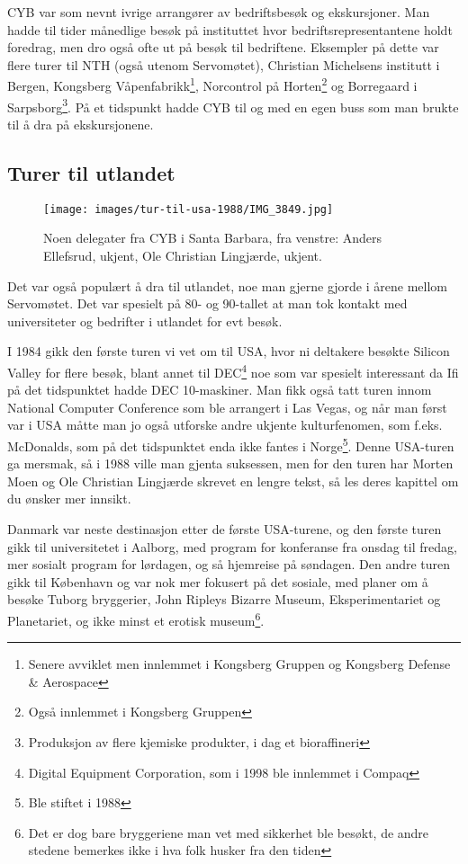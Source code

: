CYB var som nevnt ivrige arrangører av bedriftsbesøk og ekskursjoner. Man hadde til tider månedlige besøk på instituttet hvor bedriftsrepresentantene holdt foredrag, men dro også ofte ut på besøk til bedriftene. Eksempler på dette var flere turer til NTH (også utenom Servomøtet), Christian Michelsens institutt i Bergen, Kongsberg Våpenfabrikk\footnote{Senere avviklet men innlemmet i Kongsberg Gruppen og Kongsberg Defense \& Aerospace}, Norcontrol på Horten\footnote{Også innlemmet i Kongsberg Gruppen} og Borregaard i Sarpsborg\footnote{Produksjon av flere kjemiske produkter, i dag et bioraffineri}. På et tidspunkt hadde CYB til og med en egen buss som man brukte til å dra på ekskursjonene.

\subsection{Turer til utlandet}

\begin{wrapfigure}{r}{7cm}
	\vspace{-20pt}
	\centering
	\texttt{[image: images/tur-til-usa-1988/IMG\_3849.jpg]}
	\caption{Noen delegater fra CYB i Santa Barbara, fra venstre: Anders Ellefsrud, ukjent, Ole Christian Lingjærde, ukjent.}
\end{wrapfigure}

Det var også populært å dra til utlandet, noe man gjerne gjorde i årene mellom Servomøtet. Det var spesielt på 80- og 90-tallet at man tok kontakt med universiteter og bedrifter i utlandet for evt besøk.

I 1984 gikk den første turen vi vet om til USA, hvor ni deltakere besøkte Silicon Valley for flere besøk, blant annet til DEC\footnote{Digital Equipment Corporation, som i 1998 ble innlemmet i Compaq} noe som var spesielt interessant da Ifi på det tidspunktet hadde DEC 10-maskiner. Man fikk også tatt turen innom National Computer Conference som ble arrangert i Las Vegas, og når man først var i USA måtte man jo også utforske andre ukjente kulturfenomen, som f.eks. McDonalds, som på det tidspunktet enda ikke fantes i Norge\footnote{Ble stiftet i 1988}. Denne USA-turen ga mersmak, så i 1988 ville man gjenta suksessen, men for den turen har Morten Moen og Ole Christian Lingjærde skrevet en lengre tekst, så les deres kapittel om du ønsker mer innsikt.

Danmark var neste destinasjon etter de første USA-turene, og den første turen gikk til universitetet i Aalborg, med program for konferanse fra onsdag til fredag, mer sosialt program for lørdagen, og så hjemreise på søndagen. Den andre turen gikk til København og var nok mer fokusert på det sosiale, med planer om å besøke Tuborg bryggerier, John Ripleys Bizarre Museum, Eksperimentariet og Planetariet, og ikke minst et erotisk museum\footnote{Det er dog bare bryggeriene man vet med sikkerhet ble besøkt, de andre stedene bemerkes ikke i hva folk husker fra den tiden}.

